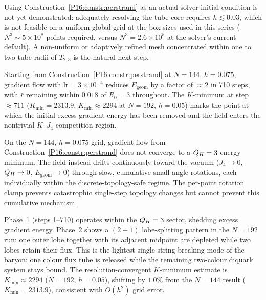 \begin{remark}
\label{P16:rem:solver_practical_recommendation}
Using Construction~\ref{P16:constr:perstrand} as an actual solver initial
condition is not yet demonstrated: adequately resolving the tube core
requires $h\lesssim0.03$, which is not feasible on a uniform global grid
at the box sizes used in this series ($N^3\sim5\times10^8$ points
required, versus $N^3=2.6\times10^5$ at the solver's current default).
A non-uniform or adaptively refined mesh concentrated within one to two
tube radii of $T_{2,3}$ is the natural next step.
\end{remark}

\begin{proposition}
\label{P16:prop:gf_phase1}
Starting from Construction~\ref{P16:constr:perstrand} at $N=144$, $h=0.075$,
gradient flow with $\mathrm{lr}=3\times10^{-4}$ reduces $E_{\mathrm{geom}}$
by a factor of $\approx2$ in 710 steps, with $\bar r$ remaining within
$0.018$ of $R_0=3$ throughout. The $K$-minimum at step $\approx711$
($K_{\min}=2313.9$; $K_{\min}\approx2294$ at $N=192$, $h=0.05$) marks
the point at which the initial excess gradient energy has been removed
and the field enters the nontrivial $K$--$J_4$ competition region.
\end{proposition}

\begin{proposition}
\label{P16:prop:gf_topology_loss}
On the $N=144$, $h=0.075$ grid, gradient flow from
Construction~\ref{P16:constr:perstrand} does not converge to a $Q_H=3$
energy minimum. The field instead drifts continuously toward the vacuum
($J_4\to0$, $Q_H\to0$, $E_{\mathrm{geom}}\to0$) through slow,
cumulative small-angle rotations, each individually within the
discrete-topology-safe regime. The per-point rotation clamp prevents
catastrophic single-step topology changes but cannot prevent this
cumulative mechanism.
\end{proposition}

\begin{remark}
\label{P16:rem:gf_twophase}
Phase~1 (steps 1--710) operates within the $Q_H=3$ sector, shedding
excess gradient energy. Phase~2 shows a $(2+1)$ lobe-splitting pattern
in the $N=192$ run: one outer lobe together with its adjacent midpoint
are depleted while two lobes retain their flux. This is the lightest
single string-breaking mode of the baryon: one colour flux tube is
released while the remaining two-colour diquark system stays bound.
The resolution-convergent $K$-minimum estimate is $K_{\min}\approx2294$
($N=192$, $h=0.05$), shifting by $1.0\%$ from the $N=144$ result
($K_{\min}=2313.9$), consistent with $O(h^2)$ grid error.
\end{remark}

